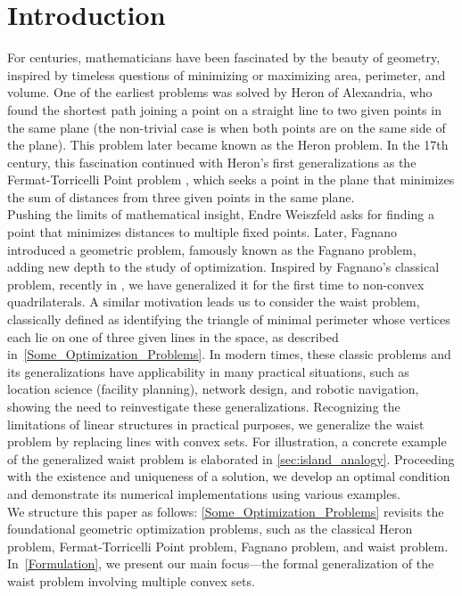 \documentclass[12pt]{article}
\theoremstyle{plain}
\theoremstyle{definition}
\begin{document}
\section{Introduction}
For centuries, mathematicians have been fascinated by the beauty of geometry, inspired by timeless questions of minimizing or maximizing area, perimeter, and volume. One of the earliest problems was solved by Heron of Alexandria, who found the shortest path joining a point on a straight line to two given points in the same plane (the non-trivial case is when both points are on the same side of the plane). This problem later became known as the Heron problem. In the 17th century, this fascination continued with Heron's first generalizations as the Fermat-Torricelli Point problem \cite{AnMuSt07}, which seeks a point in the plane that minimizes the sum of distances from three given points in the same plane.\\
\indent Pushing the limits of mathematical insight, Endre Weiszfeld\cite{We37, WePl09} asks for finding a point that minimizes distances to multiple fixed points. Later, Fagnano\cite{AnMuSt07} introduced a geometric problem, famously known as the Fagnano problem, adding new depth to the study of optimization. Inspired by Fagnano's classical problem, recently in \cite{NaCh25}, we have generalized it for the first time to non-convex quadrilaterals. A similar motivation leads us to consider the waist problem, classically defined as identifying the triangle of minimal perimeter whose vertices each lie on one of three given lines in the space, as described in~\ref{Some_Optimization_Problems}.  In modern times, these classic problems and its generalizations have applicability in many practical situations, such as location science (facility planning), network design, and robotic navigation, showing the need to reinvestigate these generalizations. Recognizing the limitations of linear structures in practical purposes, we generalize the waist problem by replacing lines with convex sets. For illustration, a concrete example of the generalized waist problem is elaborated in \ref{sec:island_analogy}. Proceeding with the existence and uniqueness of a solution, we develop an optimal condition and demonstrate its numerical implementations using various examples.\\
\indent We structure this paper as follows: \ref{Some_Optimization_Problems} revisits the foundational geometric optimization problems, such as the classical Heron problem, Fermat-Torricelli Point problem, Fagnano problem, and waist problem. In~\ref{Formulation}, we present our main focus—the formal generalization of the waist problem involving multiple convex sets.
\end{document}
